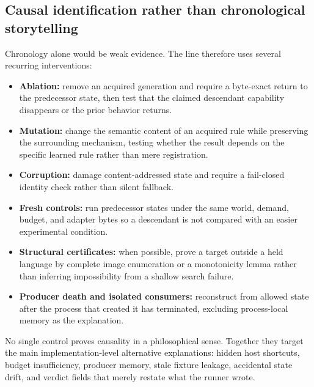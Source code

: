 \subsection{Causal identification rather than chronological storytelling}
Chronology alone would be weak evidence. The line therefore uses several recurring interventions:
\begin{itemize}
  \item \textbf{Ablation:} remove an acquired generation and require a byte-exact return to the predecessor state, then test that the claimed descendant capability disappears or the prior behavior returns.
  \item \textbf{Mutation:} change the semantic content of an acquired rule while preserving the surrounding mechanism, testing whether the result depends on the specific learned rule rather than mere registration.
  \item \textbf{Corruption:} damage content-addressed state and require a fail-closed identity check rather than silent fallback.
  \item \textbf{Fresh controls:} run predecessor states under the same world, demand, budget, and adapter bytes so a descendant is not compared with an easier experimental condition.
  \item \textbf{Structural certificates:} when possible, prove a target outside a held language by complete image enumeration or a monotonicity lemma rather than inferring impossibility from a shallow search failure.
  \item \textbf{Producer death and isolated consumers:} reconstruct from allowed state after the process that created it has terminated, excluding process-local memory as the explanation.
\end{itemize}
No single control proves causality in a philosophical sense. Together they target the main implementation-level alternative explanations: hidden host shortcuts, budget insufficiency, producer memory, stale fixture leakage, accidental state drift, and verdict fields that merely restate what the runner wrote.

